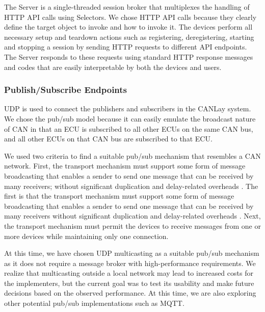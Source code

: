 \documentclass[letterpaper,twocolumn,12pt]{article}
\begin{document}
The Server is a single-threaded session broker that multiplexes the handling of HTTP API calls using Selectors. 
We chose HTTP API calls because they clearly define the target object to invoke and how to invoke it. The devices perform all necessary setup and teardown actions such as registering, deregistering, starting and stopping a session by sending HTTP requests to different API endpoints. 
The Server responds to these requests using standard HTTP response messages and codes that are easily interpretable by both the devices and users.

\subsubsection{Publish/Subscribe Endpoints}
UDP is used to connect the publishers and subscribers in the CANLay system. 
We chose the pub/sub model because it can easily emulate the broadcast nature of CAN \cite{kaiser_implementing_1999} in that an ECU is subscribed to all other ECUs on the same CAN bus, and all other ECUs on that CAN bus are subscribed to that ECU. 

We used two criteria to find a suitable pub/sub mechanism that resembles a CAN network. 
First, the transport mechanism must support some form of message broadcasting that enables a sender to send one message that can be received by many receivers; without significant duplication and delay-related overheads \cite{kaiser_implementing_1999}. 
The first is that the transport mechanism must support some form of message broadcasting that enables a sender to send one message that can be received by many receivers without significant duplication and delay-related overheads \cite{kaiser_implementing_1999}. 
Next, the transport mechanism must permit the devices to receive messages from one or more devices while maintaining only one connection.

At this time, we have chosen UDP multicasting as a suitable pub/sub mechanism as it does not require a message broker with high-performance requirements. We realize that multicasting outside a local network may lead to increased costs for the implementers, but the current goal was to test its usability and make future decisions based on the observed performance. At this time, we are also exploring other potential pub/sub implementations such as MQTT.
\end{document}
